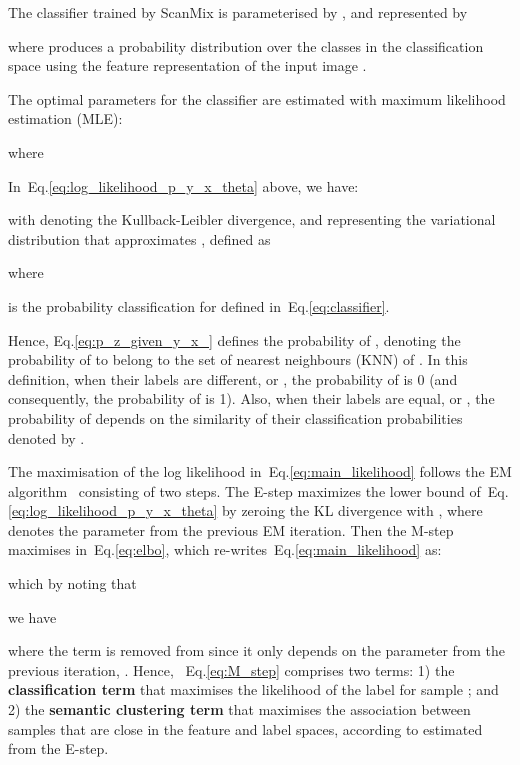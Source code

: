 \documentclass[review]{elsarticle}
\theoremstyle{plain}
\begin{document}
The classifier trained by ScanMix is parameterised by , and represented by

where  produces a probability distribution over the classes in the classification space  using the feature representation  of the input image .

The optimal parameters for the classifier are estimated with maximum likelihood estimation (MLE):

where

In~Eq.\ref{eq:log_likelihood_p_y_x_theta} above, we have:

 with  denoting the Kullback-Leibler divergence, and  representing the variational distribution that approximates , defined as

where 

 is the probability classification for defined in~Eq.\ref{eq:classifier}.

Hence, Eq.\ref{eq:p_z_given_y_x_} defines the
probability of , denoting the probability of  to belong to the set of  nearest neighbours (KNN) of . 
In this definition, when their labels are different, or , the probability of  is 0 (and consequently, the probability of  is 1).
Also, when their labels are equal, or , the probability of  depends on the similarity of their classification probabilities denoted by .



The maximisation of the log likelihood in~Eq.\ref{eq:main_likelihood} follows the EM algorithm~\citep{dempster1977maximum} consisting of two steps. The E-step maximizes the lower bound of~Eq.\ref{eq:log_likelihood_p_y_x_theta} by zeroing the KL divergence with
, where  denotes the parameter from the previous EM iteration.
Then the M-step maximises  in~Eq.\ref{eq:elbo}, which re-writes~Eq.\ref{eq:main_likelihood} as:

which by noting that

we have

where the term  is removed from  since it only depends on the parameter from the previous iteration, .  Hence, ~Eq.\ref{eq:M_step} comprises two terms: 1) the \textbf{classification term} that maximises the likelihood of the label  for sample ; and 2) the \textbf{semantic clustering term} that maximises the association between samples that are close in the feature and label spaces, according to  estimated from the E-step.  
\end{document}
